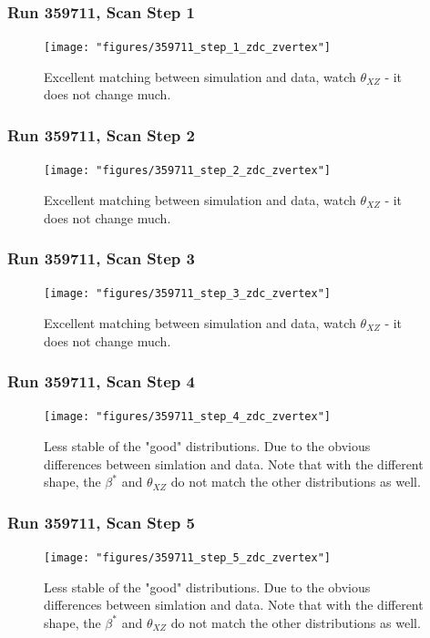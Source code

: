 \begin{frame}
\frametitle{Run 359711, Scan Step 1}
\begin{figure}
\begin{center}
\texttt{[image: "figures/359711\_step\_1\_zdc\_zvertex"]}
\caption{Excellent matching between simulation and data, watch $\theta_{XZ}$ - it does not change much.}
\label{fig:359711_step_1_zdc_zvertex}
\end{center}\end{figure}
\end{frame}

\begin{frame}
\frametitle{Run 359711, Scan Step 2}
\begin{figure}
\begin{center}
\texttt{[image: "figures/359711\_step\_2\_zdc\_zvertex"]}
\caption{Excellent matching between simulation and data, watch $\theta_{XZ}$ - it does not change much.}
\label{fig:359711_step_2_zdc_zvertex}
\end{center}\end{figure}
\end{frame}

\begin{frame}
\frametitle{Run 359711, Scan Step 3}
\begin{figure}
\begin{center}
\texttt{[image: "figures/359711\_step\_3\_zdc\_zvertex"]}
\caption{Excellent matching between simulation and data, watch $\theta_{XZ}$ - it does not change much.}
\label{fig:359711_step_3_zdc_zvertex}
\end{center}\end{figure}
\end{frame}

\begin{frame}
\frametitle{Run 359711, Scan Step 4}
\begin{figure}
\begin{center}
\texttt{[image: "figures/359711\_step\_4\_zdc\_zvertex"]}
\caption{Less stable of the "good" distributions. Due to the obvious differences between simlation and data. Note that with the different shape, the $\beta^*$ and $\theta_{XZ}$ do not match the other distributions as well.}
\label{fig:359711_step_4_zdc_zvertex}
\end{center}\end{figure}
\end{frame}

\begin{frame}
\frametitle{Run 359711, Scan Step 5}
\begin{figure}
\begin{center}
\texttt{[image: "figures/359711\_step\_5\_zdc\_zvertex"]}
\caption{Less stable of the "good" distributions. Due to the obvious differences between simlation and data. Note that with the different shape, the $\beta^*$ and $\theta_{XZ}$ do not match the other distributions as well.}
\label{fig:359711_step_5_zdc_zvertex}
\end{center}\end{figure}
\end{frame}

